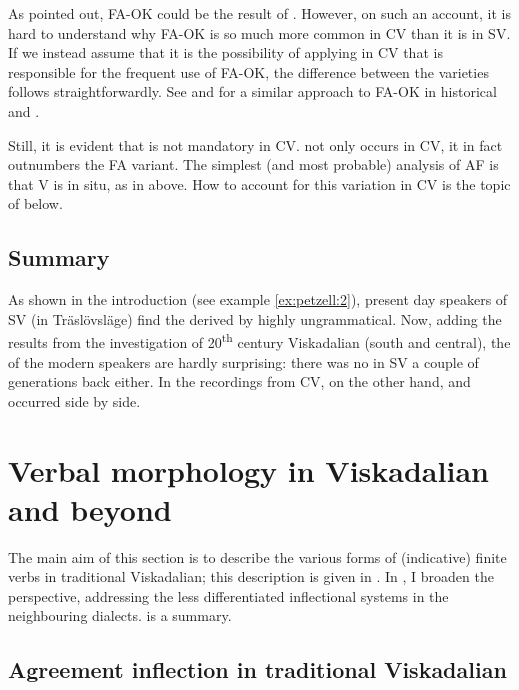 \documentclass[output=paper,colorlinks,citecolor=brown,draft,draftmode]{langscibook}
\begin{document}
As pointed out, FA-OK could be the result of  . However, on such an account, it is hard to understand why FA-OK is so much more common in CV than it is in SV. If we instead assume that it is the possibility of applying  in CV that is responsible for the frequent use of FA-OK, the difference between the varieties follows straightforwardly. See \citet{Falk1993} and \citet{Sundquist2003} for a similar approach to FA-OK in historical  and . 



Still, it is evident that  is not mandatory in CV.  not only occurs in CV, it in fact outnumbers the FA variant. The simplest (and most probable) analysis of AF is that V is in situ, as in  above. How to account for this variation in CV is the topic of  below.


\subsection{Summary}\label{sec:petzell:2.5}\largerpage[2]


As shown in the introduction (see example \ref{ex:petzell:2}), present day speakers of SV (in Träslövsläge) find the  derived by  highly ungrammatical. Now, adding the results from the investigation of 20\textsuperscript{th} century Viskadalian (south and central), the  of the modern speakers are hardly surprising: there was no  in SV a couple of generations back either.{} In the recordings from CV, on the other hand,  and  occurred side by side.


\section{Verbal morphology in Viskadalian and beyond}\label{sec:petzell:3}


The main aim of this section is to describe the various forms of (indicative) finite verbs in traditional Viskadalian; this description is given in . In , I broaden the perspective, addressing the less differentiated inflectional systems in the neighbouring dialects.  is a summary.


\subsection{Agreement inflection in traditional Viskadalian}\label{sec:petzell:3.1}
\end{document}
